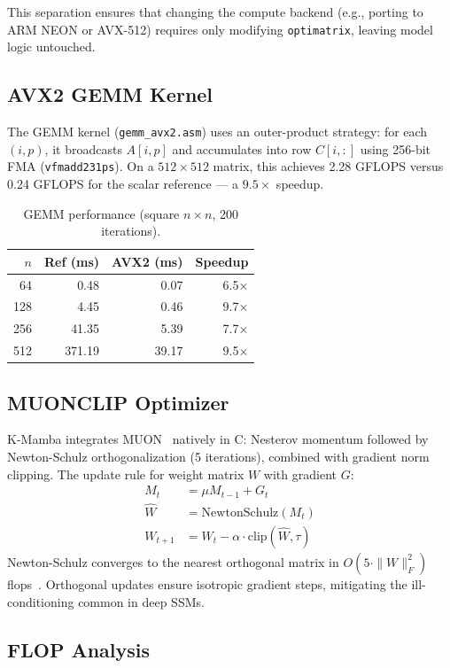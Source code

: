 \documentclass[10pt,twocolumn]{article}
\begin{document}
This separation ensures that changing the compute backend
(e.g., porting to ARM NEON or AVX-512) requires only modifying
\texttt{optimatrix}, leaving model logic untouched.

\subsection{AVX2 GEMM Kernel}

The GEMM kernel (\texttt{gemm\_avx2.asm}) uses an outer-product strategy:
for each $(i, p)$, it broadcasts $A[i,p]$ and accumulates into row $C[i,:]$
using 256-bit FMA (\texttt{vfmadd231ps}).
On a $512 \times 512$ matrix, this achieves 2.28 GFLOPS versus
0.24 GFLOPS for the scalar reference — a $9.5\times$ speedup.

\begin{table}[h]
\centering
\caption{GEMM performance (square $n \times n$, 200 iterations).}
\label{tab:gemm}
\begin{tabular}{rrrr}
\toprule
$n$ & Ref (ms) & AVX2 (ms) & Speedup \\
\midrule
 64 & 0.48 & 0.07 & 6.5× \\
128 & 4.45 & 0.46 & 9.7× \\
256 & 41.35 & 5.39 & 7.7× \\
512 & 371.19 & 39.17 & 9.5× \\
\bottomrule
\end{tabular}
\end{table}

\subsection{MUONCLIP Optimizer}

K-Mamba integrates MUON~\cite{muon2025} natively in C:
Nesterov momentum followed by Newton-Schulz orthogonalization
(5 iterations), combined with gradient norm clipping.
The update rule for weight matrix $W$ with gradient $G$:
\begin{align}
  M_t &= \mu M_{t-1} + G_t \\
  \hat{W} &= \text{NewtonSchulz}(M_t) \\
  W_{t+1} &= W_t - \alpha \cdot \text{clip}(\hat{W}, \tau)
\end{align}
Newton-Schulz converges to the nearest orthogonal matrix in
$O(5 \cdot \|W\|_F^2)$ flops~\cite{bjorck1971}.
Orthogonal updates ensure isotropic gradient steps,
mitigating the ill-conditioning common in deep SSMs.

\subsection{FLOP Analysis}
\end{document}
